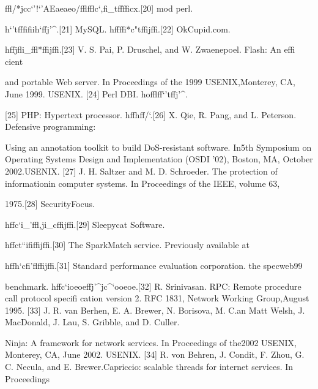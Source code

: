 \Omega ffl/*j\Omega cc`'!`'AEaeaeo/\Psi fflfflc\Psi *`,fi_t\Sigma ffffic\Upsilon x.[20] mod perl.

h\Sigma \Sigma \Upsilon \Phi \Psi \Psi \Upsilon `'tfffi\Upsilon fiih`ffj'^.[21] MySQL.
h\Sigma \Sigma \Upsilon \Phi \Psi \Psi \Omega \Omega \Omega ffffi*c"tffijffi.[22] OkCupid.com.

h\Sigma \Sigma \Upsilon \Phi \Psi \Psi \Omega \Omega \Omega ffjfli_\Upsilon ffl*ffijffi.[23] V. S. Pai, P. Druschel, and W. Zwaenepoel. Flash: An effi cient

and portable Web server. In Proceedings of the 1999 USENIX,Monterey, CA, June 1999. USENIX.
[24] Perl DBI. h\Sigma \Sigma \Upsilon \Phi \Psi \Psi *offlff\Upsilon `'tffj'^.

[25] PHP: Hypertext processor. h\Sigma \Sigma \Upsilon \Phi \Psi \Psi \Omega \Omega \Omega ff\Upsilon h\Upsilon ff/`\Sigma .[26] X. Qie, R. Pang, and L. Peterson. Defensive programming:

Using an annotation toolkit to build DoS-resistant software. In5th Symposium on Operating Systems Design and
Implementation (OSDI '02), Boston, MA, October 2002.USENIX.
[27] J. H. Saltzer and M. D. Schroeder. The protection of informationin computer systems. In Proceedings of the IEEE, volume 63,

1975.[28] SecurityFocus.

h\Sigma \Sigma \Upsilon \Phi \Psi \Psi \Omega \Omega \Omega ffc`i_'ffl\Sigma *,ji_cffijffi.[29] Sleepycat Software.

h\Sigma \Sigma \Upsilon \Phi \Psi \Psi \Omega \Omega \Omega ffct``\Upsilon *ifi\Sigma ffijffi.[30] The SparkMatch service. Previously available at

h\Sigma \Sigma \Upsilon \Phi \Psi \Psi \Omega \Omega \Omega ff\Sigma h`c\Upsilon fi'flffijffi.[31] Standard performance evaluation corporation. the specweb99

benchmark. h\Sigma \Sigma \Upsilon \Phi \Psi \Psi \Omega \Omega \Omega ffc\Upsilon `ioeoeffj'^\Psi jc^\Psi \Omega `ooeoe\Psi .[32] R. Srinivasan. RPC: Remote procedure call protocol
specifi cation version 2. RFC 1831, Network Working Group,August 1995.
[33] J. R. van Berhen, E. A. Brewer, N. Borisova, M. C.an Matt Welsh, J. MacDonald, J. Lau, S. Gribble, and D. Culler.

Ninja: A framework for network services. In Proceedings of the2002 USENIX, Monterey, CA, June 2002. USENIX.
[34] R. von Behren, J. Condit, F. Zhou, G. C. Necula, and E. Brewer.Capriccio: scalable threads for internet services. In Proceedings

